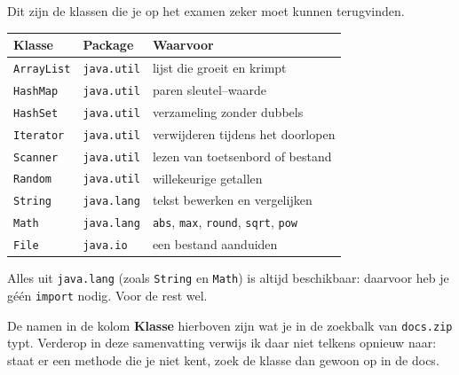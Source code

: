 \documentclass[a4paper,11pt]{article}
\begin{document}
\begin{examenbox}
    Dit zijn de klassen die je op het examen zeker moet kunnen terugvinden.
\end{examenbox}

\begin{center}
    \begin{tabular}{@{}llp{6.0cm}@{}}
        \toprule
        \textbf{Klasse}    & \textbf{Package}   & \textbf{Waarvoor}                                                       \\
        \midrule
        \texttt{ArrayList} & \texttt{java.util} & lijst die groeit en krimpt                                              \\
        \texttt{HashMap}   & \texttt{java.util} & paren sleutel--waarde                                                   \\
        \texttt{HashSet}   & \texttt{java.util} & verzameling zonder dubbels                                              \\
        \texttt{Iterator}  & \texttt{java.util} & verwijderen tijdens het doorlopen                                       \\
        \texttt{Scanner}   & \texttt{java.util} & lezen van toetsenbord of bestand                                        \\
        \texttt{Random}    & \texttt{java.util} & willekeurige getallen                                                   \\
        \texttt{String}    & \texttt{java.lang} & tekst bewerken en vergelijken                                           \\
        \texttt{Math}      & \texttt{java.lang} & \texttt{abs}, \texttt{max}, \texttt{round}, \texttt{sqrt}, \texttt{pow} \\
        \texttt{File}      & \texttt{java.io}   & een bestand aanduiden                                                   \\
        \bottomrule
    \end{tabular}
\end{center}

Alles uit \texttt{java.lang} (zoals \texttt{String} en \texttt{Math}) is altijd
beschikbaar: daarvoor heb je g\'e\'en \texttt{import} nodig. Voor de rest wel.

De namen in de kolom \textbf{Klasse} hierboven zijn wat je in de zoekbalk van
\texttt{docs.zip} typt. Verderop in deze samenvatting verwijs ik daar niet telkens
opnieuw naar: staat er een methode die je niet kent, zoek de klasse dan gewoon op
in de docs.
\end{document}
